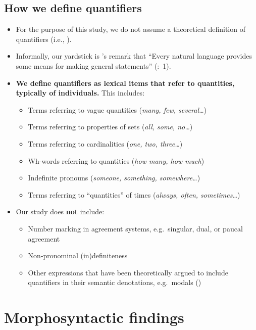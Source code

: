 \documentclass{article}
\begin{document}
\subsection{How we define quantifiers}
\begin{itemize}
\item For the purpose of this study, we do not assume a theoretical definition of quantifiers (i.e., \citealt{heimkratzer98}).
\item Informally, our yardstick is \citeauthor{qnl95}'s remark that ``Every natural language provides some means for making general statements'' (\citeyear{qnl95}:~1).
\item \textbf{We define quantifiers as lexical items that refer to quantities, typically of individuals.}  This includes:
  
  
  \begin{itemize}
  \item Terms referring to vague quantities (\textit{many, few, several\ldots})
  \item Terms referring to properties of sets (\textit{all, some, no\ldots})
  \item Terms referring to cardinalities (\textit{one, two, three\ldots})
  \item Wh-words referring to quantities  (\textit{how many, how much})
  \item Indefinite pronouns (\textit{someone, something, somewhere\ldots})
  \item Terms referring to ``quantities'' of times (\textit{always, often, sometimes\ldots})
  \end{itemize}
\item Our study does \textbf{not} include:
  \begin{itemize}
  \item Number marking in agreement systems, e.g.\ singular, dual, or paucal agreement
  \item Non-pronominal (in)definiteness
  \item Other expressions that have been theoretically argued to include quantifiers in their semantic denotations, e.g.\ modals (\citealt{heimkratzer98})
  \end{itemize}
\end{itemize}

\section{Morphosyntactic findings}
\label{sec:mpsfind}
\end{document}
